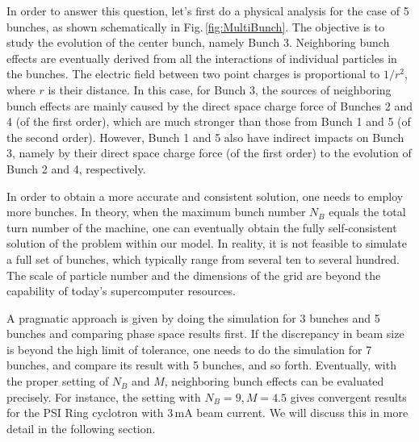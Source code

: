 \documentclass[aps,prstab,twocolumn,superscriptaddress,showpacs]{revtex4}
\begin{document}
In order to answer this question, let's first do a physical analysis for the case of 5 bunches, as shown schematically in Fig.\,\ref{fig:MultiBunch}.
The objective is to study the evolution of the center bunch, namely Bunch 3. 
Neighboring bunch effects are eventually derived from all the interactions of individual particles in the bunches. 
The electric field between two point charges is proportional to $1/r^2$, where $r$ is their distance. In this case, for Bunch 3, the sources
of neighboring bunch effects are mainly caused by the direct space charge force of Bunches 2 and 4 (of the first order), which are much stronger than 
those from Bunch 1 and 
5 (of the second order). However, Bunch 1 and 5 also have indirect impacts on Bunch 3, 
namely by their direct space charge force (of the first order) to the evolution of Bunch 2 and 4, respectively. 

In order to obtain a more accurate and consistent solution, one needs to employ more bunches. In theory, when the maximum bunch number $N_B$ equals the total turn number of the machine, one can eventually obtain the fully self-consistent solution of the problem within our model. 
In reality, it is not feasible  to simulate a full set of bunches, which typically range from 
several ten to several hundred.
The scale of particle number and the dimensions of the grid are beyond the capability of today's supercomputer resources.

A pragmatic approach is given by doing the simulation for 3 bunches and 5 bunches and comparing phase space results first. If the discrepancy in beam size is beyond 
the high limit of tolerance, one needs to do the simulation for 7 bunches, and compare its result with 5 bunches, and so forth. 
Eventually, with the proper setting of $N_B$ and $M$, neighboring bunch effects can be evaluated precisely.
For instance, the setting with $N_B=9, M=4.5$ gives convergent results for the PSI Ring cyclotron with 3\,mA beam current.
We will discuss this in more detail in the following section. 
\end{document}
